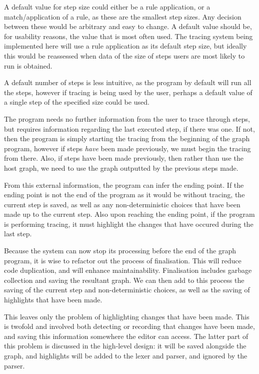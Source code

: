 \documentclass{UoYCSproject}
\begin{document}
A default value for step size could either be a rule application, or a match/application of a rule, as these are the smallest step sizes. Any decision between these would be arbitrary and easy to change. A default value should be, for usability reasons, the value that is most often used. The tracing system being implemented here will use a rule application as its default step size, but ideally this would be reassessed when data of the size of steps users are most likely to run is obtained.

A default number of steps is less intuitive, as the program by default will run all the steps, however if tracing is being used by the user, perhaps a default value of a single step of the specified size could be used. 

The program needs no further information from the user to trace through steps, but requires information regarding the last executed step, if there was one. If not, then the program is simply starting the tracing from the beginning of the graph program, however if steps \emph{have} been made previously, we must begin the tracing from there. Also, if steps have been made previously, then rather than use the host graph, we need to use the graph outputted by the previous steps made. 

From this external information, the program can infer the ending point. If the ending point is not the end of the program as it would be without tracing, the current step is saved, as well as any non-deterministic choices that have been made up to the current step. Also upon reaching the ending point, if the program is performing tracing, it must highlight the changes that have occured during the last step.

Because the system can now stop its processing before the end of the graph program, it is wise to refactor out the process of finalisation. This will reduce code duplication, and will enhance maintainability. Finalisation includes garbage collection and saving the resultant graph. We can then add to this process the saving of the current step and non-deterministic choices, as well as the saving of highlights that have been made.

This leaves only the problem of highlighting changes that have been made. This is twofold and involved both detecting or recording that changes have been made, and saving this information somewhere the editor can access. The latter part of this problem is discussed in the high-level design: it will be saved alongside the graph, and highlights will be added to the lexer and parser, and ignored by the parser. 
\end{document}
